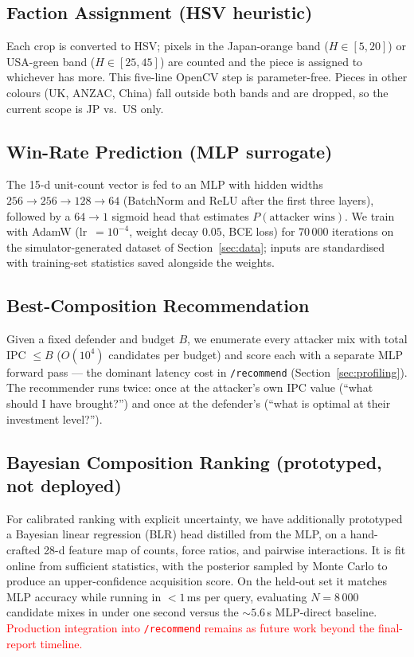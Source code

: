 \documentclass[10pt,twocolumn,letterpaper]{article}
\newcommand{\red}[1]{\textcolor{red}{#1}}
\begin{document}
\subsection{Faction Assignment (HSV heuristic)}
\label{sec:faction}

Each crop is converted to HSV; pixels in the Japan-orange band
($H\!\in\![5,20]$) or USA-green band ($H\!\in\![25,45]$) are
counted and the piece is assigned to whichever has more.
This five-line OpenCV step is parameter-free.
Pieces in other colours (UK, ANZAC, China) fall outside both bands
and are dropped, so the current scope is JP vs.\ US only.

\subsection{Win-Rate Prediction (MLP surrogate)}
\label{sec:mlp}

The 15-d unit-count vector is fed to an MLP with hidden widths
$256\!\to\!256\!\to\!128\!\to\!64$ (BatchNorm and ReLU after the
first three layers), followed by a $64\!\to\!1$ sigmoid head that
estimates $P(\text{attacker wins})$. We train with AdamW
(lr~$=\!10^{-4}$, weight decay $0.05$,
BCE loss) for $70\,000$ iterations on the simulator-generated
dataset of Section~\ref{sec:data}; inputs are standardised with
training-set statistics saved alongside the weights.

\subsection{Best-Composition Recommendation}
\label{sec:recommend}

Given a fixed defender and budget $B$, we enumerate every attacker
mix with total IPC $\leq B$ ($O(10^{4})$ candidates per budget) and
score each with a separate MLP forward pass --- the dominant
latency cost in \texttt{/recommend}
(Section~\ref{sec:profiling}). The recommender runs twice: once at
the attacker's own IPC value (``what should I have brought?'') and
once at the defender's (``what is optimal at their investment
level?'').

\subsection{Bayesian Composition Ranking (prototyped, not deployed)}
\label{sec:blr}

For calibrated ranking with explicit uncertainty, we have
additionally prototyped a
Bayesian linear regression (BLR) head distilled from the MLP, on a
hand-crafted 28-d feature map of counts, force ratios, and pairwise
interactions. It is fit online from sufficient statistics, with the
posterior sampled by Monte Carlo to produce an upper-confidence
acquisition score. On the held-out set it matches MLP accuracy
while running in $<\!1$\,ms per query, evaluating $N\!=\!8\,000$
candidate mixes in under one second versus the $\sim\!5.6$\,s
MLP-direct baseline.
\red{Production integration into \texttt{/recommend} remains as
future work beyond the final-report timeline.}
\end{document}
